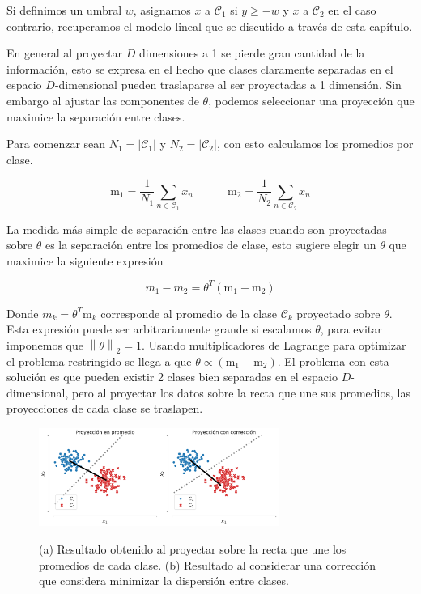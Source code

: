 Si definimos un umbral $w$, asignamos $x$ a $\mathcal{C}_1$ si $y\geq-w$ y $x$ a $\mathcal{C}_2$ en el caso contrario, recuperamos el modelo lineal que se discutido a través de esta capítulo.

En general al proyectar $D$ dimensiones a 1 se pierde gran cantidad de la información, esto se expresa en el hecho que clases claramente separadas en el espacio $D$-dimensional pueden traslaparse al ser proyectadas a 1 dimensión. Sin embargo al ajustar las componentes de $\theta$, podemos seleccionar una proyección que maximice la separación entre clases.

Para comenzar sean $N_1 = |\mathcal{C}_1|$ y $N_2 = |\mathcal{C}_2|$, con esto calculamos los promedios por clase.

\begin{equation}
    \text{m}_1=\frac{1}{N_1}\sum_{n\in\mathcal{C}_1}x_n
    \quad\quad\quad
    \text{m}_2=\frac{1}{N_2}\sum_{n\in\mathcal{C}_2}x_n
\end{equation}

La medida más simple de separación entre las clases cuando son proyectadas sobre $\theta$ es la separación entre los promedios de clase, esto sugiere elegir un $\theta$ que maximice la siguiente expresión

\begin{equation}
    m_1 - m_2 = \theta^T(\text{m}_1-\text{m}_2)
\end{equation}

Donde $m_k= \theta^T\text{m}_k$ corresponde al promedio de la clase $\mathcal{C}_k$ proyectado sobre $\theta$. Esta expresión puede ser arbitrariamente grande si escalamos $\theta$, para evitar imponemos que $\left \| \theta \right \|_2=1$. Usando multiplicadores de Lagrange para optimizar el problema restringido se llega a que $\theta\propto(\text{m}_1-\text{m}_2)$. El problema con esta solución es que pueden existir 2 clases bien separadas en el espacio $D$-dimensional, pero al proyectar los datos sobre la recta que une sus promedios, las proyecciones de cada clase se traslapen.

\begin{figure}[H]
    \centering
    \includegraphics[width=0.7\textwidth]{img/cap2_dos_clases_proyeccion.pdf}\\
    \caption{(a) Resultado obtenido al proyectar sobre la recta que une los promedios de cada clase. (b) Resultado al considerar una corrección que considera minimizar la dispersión entre clases.}
    \label{fig:ej_fda}
\end{figure}

